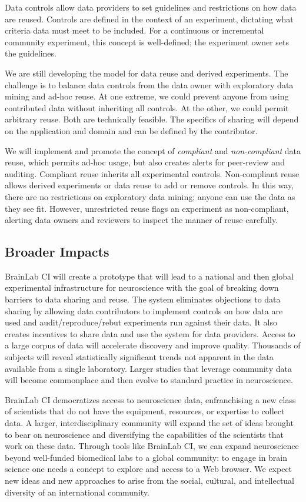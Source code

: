 Data controls allow data providers to set guidelines and restrictions on how data are reused.
Controls are defined in the context of an experiment, dictating what criteria data must meet 
to be included.  For a continuous or incremental community experiment, this concept is 
well-defined; the experiment owner sets the guidelines.

We are still developing the model for data reuse and derived experiments.  The challenge
is to balance data controls from the data owner with exploratory data mining and
ad-hoc reuse.  At one extreme, we could prevent anyone from using contributed data 
without inheriting all controls.  At the other, we could permit arbitrary reuse.  
Both are technically feasible.  The specifics of sharing will depend on the application
and domain and can be defined by the contributor.

We will implement and promote the concept of {\em compliant} and {\em non-compliant} data reuse, 
which permits ad-hoc usage, but also creates alerts for peer-review and auditing.
Compliant reuse inherits all experimental controls.  Non-compliant reuse allows derived
experiments or data reuse to add or remove controls.  In this way, there are no restrictions on 
exploratory data mining; anyone can use the data as they see fit.  However, unrestricted 
reuse flags an experiment as non-compliant, alerting data owners and reviewers to inspect 
the manner of reuse carefully.


\subsection{Broader Impacts}

BrainLab CI will create a prototype that will lead to a national and then global 
experimental infrastructure for neuroscience with the goal of breaking down barriers 
to data sharing and reuse.  The system eliminates objections to data sharing by 
allowing data contributors to implement controls on how data are used and audit/reproduce/rebut
experiments run against their data.  It also creates incentives to share data and use
the system for data providers.  Access to a large corpus of data will accelerate discovery and 
improve quality.  Thousands of subjects will reveal statistically significant trends not apparent in 
the data available from a single laboratory.  Larger studies that leverage community
data will become commonplace and then evolve to standard practice in neuroscience.

BrainLab CI democratizes access to neuroscience data, enfranchising a new class of scientists
that do not have the equipment, resources, or expertise to collect data. A larger, interdisciplinary
community will expand the set of ideas brought to bear on neuroscience and diversifying
the capabilities of the scientists that work on these data.  
Through tools like BrainLab CI, we can expand neuroscience beyond well-funded biomedical labs 
to a global community: to engage in brain science one needs a concept to explore and access to a 
Web browser.  We expect new ideas and new approaches to arise from the social, cultural, and 
intellectual diversity of an international community.

